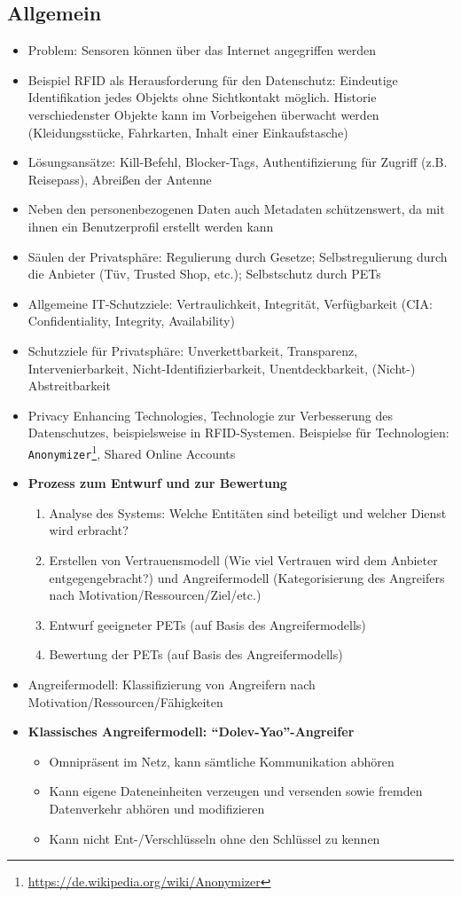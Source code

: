 \subsection{Allgemein}
\begin{itemize}
	\item Problem: Sensoren können über das Internet angegriffen werden
	\item Beispiel RFID als Herausforderung für den Datenschutz: Eindeutige Identifikation jedes Objekts ohne Sichtkontakt möglich. Historie verschiedenster Objekte kann im Vorbeigehen überwacht werden (Kleidungsstücke, Fahrkarten, Inhalt einer Einkaufstasche)
	\item Lösungsansätze: Kill-Befehl, Blocker-Tags, Authentifizierung für Zugriff (z.B. Reisepass), Abreißen der Antenne
	\item Neben den personenbezogenen Daten auch Metadaten schützenswert, da mit ihnen ein Benutzerprofil erstellt werden kann
	\item Säulen der Privatsphäre: Regulierung durch Gesetze; Selbstregulierung durch die Anbieter (Tüv, Trusted Shop, etc.); Selbstschutz durch PETs
	\item Allgemeine IT-Schutzziele: Vertraulichkeit, Integrität, Verfügbarkeit (CIA: Confidentiality, Integrity, Availability)
	\item Schutzziele für Privatsphäre: Unverkettbarkeit, Transparenz, Intervenierbarkeit, Nicht-Identifizierbarkeit, Unentdeckbarkeit, (Nicht-) Abstreitbarkeit
	\item Privacy Enhancing Technologies, Technologie zur Verbesserung des Datenschutzes, beispielsweise in RFID-Systemen. Beispielse für Technologien: \texttt{Anonymizer}\footnote{\url{https://de.wikipedia.org/wiki/Anonymizer}}, Shared Online Accounts
	\item \textbf{Prozess zum Entwurf und zur Bewertung}
	\begin{enumerate}
		\item Analyse des Systems: Welche Entitäten sind beteiligt und welcher Dienst wird erbracht?
		\item Erstellen von Vertrauensmodell (Wie viel Vertrauen wird dem Anbieter entgegengebracht?) und Angreifermodell (Kategorisierung des Angreifers nach Motivation/Ressourcen/Ziel/etc.)
		\item Entwurf geeigneter PETs (auf Basis des Angreifermodells)
		\item Bewertung der PETs (auf Basis des Angreifermodells)
	\end{enumerate}
	\item Angreifermodell: Klassifizierung von Angreifern nach Motivation/Ressourcen/Fähigkeiten
	\item \textbf{Klassisches Angreifermodell: "`Dolev-Yao"'-Angreifer}
	\begin{itemize}
		\item Omnipräsent im Netz, kann sämtliche Kommunikation abhören
		\item Kann eigene Dateneinheiten verzeugen und versenden sowie fremden Datenverkehr abhören und modifizieren
		\item Kann nicht Ent-/Verschlüsseln ohne den Schlüssel zu kennen
	\end{itemize}
\end{itemize}


